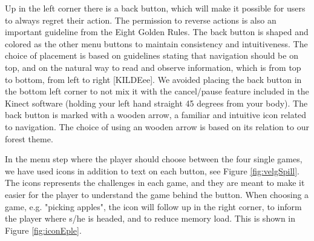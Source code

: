 Up in the left corner there is a back button, which will make it possible for users to always regret their action. The permission to reverse actions is also an important guideline from the Eight Golden Rules. The back button is shaped and colored as the other menu buttons to maintain consistency and intuitiveness. The choice of placement is based on guidelines stating that navigation should be on top, and on the natural way to read and observe information, which is from top to bottom, from left to right [KILDEee]. We avoided placing the back button in the bottom left corner to not mix it with the cancel/pause feature included in the Kinect software (holding your left hand straight 45 degrees from your body). The back button is marked with a wooden arrow, a familiar and intuitive icon related to navigation. The choice of using an wooden arrow is based on its relation to our forest theme. 

In the menu step where the player should choose between the four single games, we have used icons in addition to text on each button, see Figure \ref{fig:velgSpill}. The icons represents the challenges in each game, and they are meant to make it easier for the player to understand the game behind the button. When choosing a game, e.g. "picking apples", the icon will follow up in the right corner, to inform the player where s/he is headed, and to reduce memory load. This is shown in Figure \ref{fig:iconEple}.  

